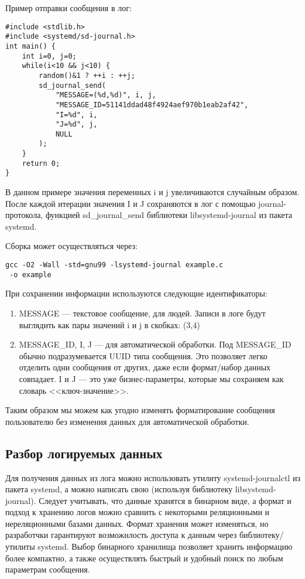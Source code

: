 \documentclass[10pt, a5paper]{article}
\begin{document}
Пример отправки сообщения в лог:

\begin{verbatim}
#include <stdlib.h>
#include <systemd/sd-journal.h>
int main() {
    int i=0, j=0;
    while(i<10 && j<10) {
        random()&1 ? ++i : ++j;
        sd_journal_send(
            "MESSAGE=(%d,%d)", i, j,
            "MESSAGE_ID=51141ddad48f4924aef970b1eab2af42",
            "I=%d", i, 
            "J=%d", j,
            NULL
        );
    }
    return 0;
}
\end{verbatim}

В данном примере значения переменных i и j увеличиваются случайным образом. После каждой итерации значения I и J сохраняются в лог с помощью journal-протокола, функцией sd\_journal\_send библиотеки libsystemd-journal из пакета systemd.

Сборка может осуществляться через:

\begin{verbatim}
gcc -O2 -Wall -std=gnu99 -lsystemd-journal example.c
 -o example
\end{verbatim}

При сохранении информации используются следующие идентификаторы:

\begin{enumerate}
  \item MESSAGE --- текстовое сообщение, для людей. Записи в логе будут выглядить как пары значений i и j в скобках: (3,4)
  \item MESSAGE\_ID, I, J --- для автоматической обработки. Под MESSAGE\_ID обычно подразумевается UUID типа сообщения. Это позволяет легко отделить одни сообщения от других, даже если формат/набор данных совпадает. I и J --- это уже бизнес-параметры, которые мы сохраняем как словарь <<ключ-значение>>.
\end{enumerate}

Таким образом мы можем как угодно изменять форматирование сообщения пользователю без изменения данных для автоматической обработки.

\subsection*{Разбор логируемых данных}

Для получения данных из лога можно использовать утилиту systemd-journalctl из пакета systemd, а можно написать свою (используя библиотеку libsystemd-journal). Следует учитывать, что данные хранятся в бинарном виде, а формат и подход к хранению логов можно сравнить с некоторыми реляционными и нереляционными базами данных. Формат хранения может изменяться, но разработчки гарантируют возможнлость доступа к данным через библиотеку/утилиты systemd. Выбор бинарного хранилища позволяет хранить информацию более компактно, а также осуществлять быстрый и удобный поиск по любым параметрам сообщения.
\end{document}
